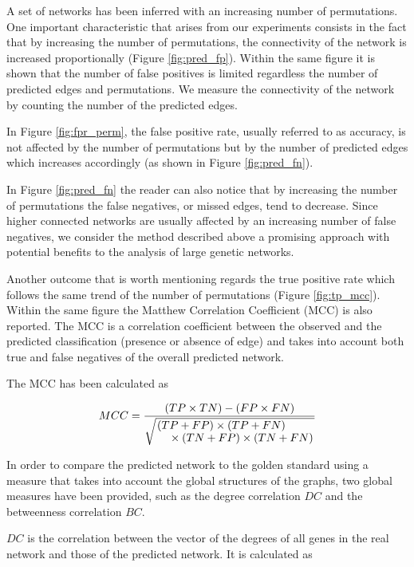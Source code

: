 A set of networks has been inferred with an increasing number of permutations. One important characteristic that arises from our experiments consists in the fact that by increasing the number of permutations, the connectivity of the network is increased proportionally (Figure \ref{fig:pred_fp}). Within the same figure it is shown that the number of false positives is limited regardless the number of predicted edges and permutations.   
We measure the connectivity of the network by counting the number of the predicted edges. 

In Figure \ref{fig:fpr_perm}, the false positive rate, usually referred to as accuracy, is not affected by the number of permutations but by the number of predicted edges which increases accordingly (as shown in Figure \ref{fig:pred_fn}). 

In Figure \ref{fig:pred_fn} the reader can also notice that by increasing the number of permutations the false negatives, or missed edges, tend to decrease. Since higher connected networks are usually affected by an increasing number of false negatives, we consider the method described above a promising approach with potential benefits to the analysis of large genetic networks. 

Another outcome that is worth mentioning regards the true positive rate which follows the same trend of the number of permutations (Figure \ref{fig:tp_mcc}). 
Within the same figure the Matthew Correlation Coefficient (MCC) is also reported. The MCC is a correlation coefficient between the observed and the predicted classification (presence or absence of edge) and takes into account both true and false negatives of the overall predicted network.
 
The MCC has been calculated as 

\begin{equation}
MCC = \frac{(TP \times TN) - (FP \times FN)}{\sqrt{\splitfrac{(TP+FP)\times(TP+FN)}{
\times(TN+FP)\times(TN+FN)} }}
\label{eq:mcc}
\end{equation}

In order to compare the predicted network to the golden standard using a measure that takes into account the global structures of the graphs, two global measures have been provided, such as the degree correlation $DC$ and the betweenness correlation $BC$.
 
$DC$ is the correlation between the vector of the degrees of all genes in the real network and those of the predicted network. It is calculated as 

